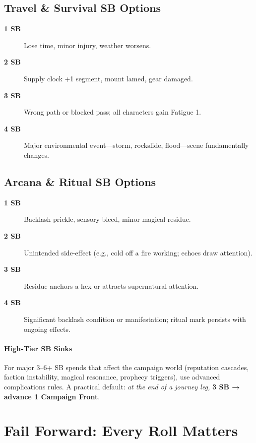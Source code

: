 \subsection{Travel \& Survival SB Options}
\label{subsec:travel-sb}

\begin{description}
\item[\textbf{1 SB}] Lose time, minor injury, weather worsens.
\item[\textbf{2 SB}] Supply clock +1 segment, mount lamed, gear damaged.
\item[\textbf{3 SB}] Wrong path or blocked pass; all characters gain Fatigue 1.
\item[\textbf{4 SB}] Major environmental event—storm, rockslide, flood—scene fundamentally changes.
\end{description}

\subsection{Arcana \& Ritual SB Options}
\label{subsec:arcana-sb}

\begin{description}
\item[\textbf{1 SB}] Backlash prickle, sensory bleed, minor magical residue.
\item[\textbf{2 SB}] Unintended side-effect (e.g., cold off a fire working; echoes draw attention).
\item[\textbf{3 SB}] Residue anchors a hex or attracts supernatural attention.
\item[\textbf{4 SB}] Significant backlash condition or manifestation; ritual mark persists with ongoing effects.
\end{description}

\paragraph{High-Tier SB Sinks} 
For major 3–6+ SB spends that affect the campaign world (reputation cascades, faction instability, magical resonance, prophecy triggers), use advanced complications rules. A practical default: \emph{at the end of a journey leg,} \textbf{3 SB → advance 1 Campaign Front}.

\section{Fail Forward: Every Roll Matters}
\label{sec:fail-forward}

